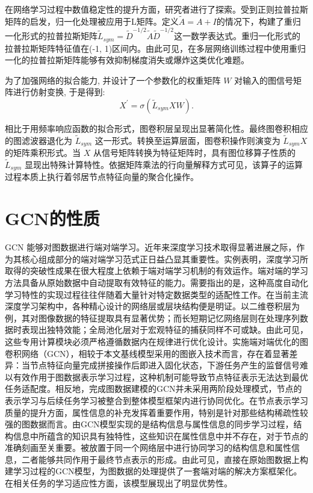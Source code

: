 在网络学习过程中数值稳定性的提升方面，研究者\textcite{2016_Kipf_Semi_supervised_classification_with_graph_convolutionalnetworks}进行了探索。受到正则拉普拉斯矩阵的启发，归一化处理被应用于L矩阵。定义\(\widetilde{A} = A + I\)的情况下，构建了重归一化形式的拉普拉斯矩阵\({\widetilde{L}}_{sym} = {\widetilde{D}}^{-1/2}\widetilde{A}{\widetilde{D}}^{-1/2}\)这一数学表达式。重归一化形式的拉普拉斯矩阵特征值在(-1, 1)区间内。由此可见，在多层网络训练过程中使用重归一化的拉普拉斯矩阵能够有效抑制梯度消失或爆炸这类优化难题。

为了加强网络的拟合能力, 并设计了一个参数化的权重矩阵 \({W}\) 对输入的图信号矩阵进行仿射变换, 于是得到:
\[
{X}^{\prime } = \sigma \left( {{\widetilde{L}}_{sym}{XW}}\right).
\]

相比于用频率响应函数的拟合形式，图卷积层呈现出显著简化性。最终图卷积相应的图滤波器退化为 \({\widetilde{L}}_{sym}\) 这一形式。转换至运算层面，图卷积操作则演变为 \({\widetilde{L}}_{sym}{X}\) 的矩阵乘积形式。当 \({X}\) 从信号矩阵转换为特征矩阵时，具有图位移算子性质的 \({\widetilde{L}}_{sym}\) 显现出特殊计算特性。依据矩阵乘法的行向量解释方式可见，该算子的运算过程本质上执行着邻居节点特征向量的聚合化操作。


\section{GCN的性质}
GCN 能够对图数据进行端对端学习。近年来深度学习技术取得显著进展之际，作为其核心组成部分的端对端学习范式正日益凸显其重要性。实例表明，深度学习所取得的突破性成果在很大程度上依赖于端对端学习机制的有效运作。端对端的学习方法具备从原始数据中自动提取有效特征的能力。需要指出的是，这种高度自动化学习特性的实现过程往往伴随着大量针对特定数据类型的适配性工作。在当前主流深度学习架构中，各种精心设计的网络层或层块结构便是明证。以二维卷积层为例，其对图像数据的特征提取具有显著优势；而长短期记忆网络层则在处理序列数据时表现出独特效能；全局池化层对于宏观特征的捕获同样不可或缺。由此可见，这些专用计算模块必须严格遵循数据内在规律进行优化设计。实施端对端优化的图卷积网络（GCN），相较于本文基线模型采用的图嵌入技术而言，存在着显著差异：当节点特征向量完成拼接操作后即进入固化状态，下游任务产生的监督信号难以有效作用于图数据表示学习过程，这种机制可能导致节点特征表示无法达到最优任务适配度。相反地，完成图数据建模的GCN并未采用两阶段处理模式，节点的表示学习与后续任务学习被整合到整体模型框架内进行协同优化。在节点表示学习质量的提升方面，属性信息的补充发挥着重要作用，特别是针对那些结构稀疏性较强的图数据而言。由GCN模型实现的是结构信息与属性信息的同步学习过程，结构信息中所蕴含的知识具有独特性，这些知识在属性信息中并不存在，对于节点的准确刻画至关重要。被放置于同一个网络层中进行协同学习的结构信息和属性信息，二者能够共同作用于最终节点表示的形成。由此可见，直接在原始图数据上构建学习过程的GCN模型，为图数据的处理提供了一套端对端的解决方案框架化。在相关任务的学习适应性方面，该模型展现出了明显优势性。

